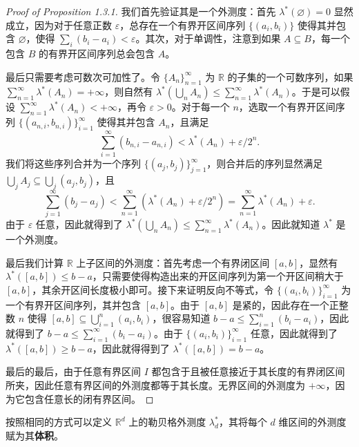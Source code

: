 \documentclass[11pt]{article}
\newcommand{\RR}{\mathbb{R}}
\newcommand{\diam}{\varnothing}
\begin{document}
\begin{proof}[Proof of Proposition 1.3.1]
    我们首先验证其是一个外测度：首先 $\lambda^*(\diam)=0$ 显然成立，因为对于任意正数 $\varepsilon$，总存在一个有界开区间序列 $\{(a_i,b_i)\}$ 使得其并包含 $\diam$，使得 $\sum_i (b_i-a_i)<\varepsilon$。其次，对于单调性，注意到如果 $A \subseteq B$，每一个包含 $B$ 的有界开区间序列总会包含 $A$。

    最后只需要考虑可数次可加性了。令 $\{A_n\}_{n=1}^{\infty}$ 为 $\RR$ 的子集的一个可数序列，如果 $\sum_{n=1}^{\infty}\lambda^*(A_n)=+\infty$，则自然有 $\lambda^*(\bigcup_n A_n)\le \sum_{n=1}^{\infty}\lambda^*(A_n)$。于是可以假设 $\sum_{n=1}^{\infty}\lambda^*(A_n)<+\infty$，再令 $\varepsilon>0$。对于每一个 $n$，选取一个有界开区间序列 $\{(a_{n,i},b_{n,i})\}_{i=1}^{\infty}$ 使得其并包含 $A_n$，且满足
    \[
        \sum_{i=1}^{\infty}(b_{n,i}-a_{n,i}) < \lambda^*(A_n) + \varepsilon / 2^n.
    \]
    我们将这些序列合并为一个序列 $\{(a_j,b_j)\}_{j=1}^{\infty}$，则合并后的序列显然满足 $\bigcup_j A_j \subseteq \bigcup_j (a_j,b_j)$，且
    \[
        \sum_{j=1}^{\infty}(b_j-a_j)
        < \sum_{n=1}^{\infty}\left(\lambda^*(A_n)+\varepsilon/2^n\right)
        = \sum_{n=1}^{\infty}\lambda^*(A_n)+\varepsilon.
    \]
    由于 $\varepsilon$ 任意，因此就得到了 $\lambda^*(\bigcup_n A_n)\le \sum_{n=1}^{\infty}\lambda^*(A_n)$。因此就知道 $\lambda^*$ 是一个外测度。

    最后我们计算 $\RR$ 上子区间的外测度：首先考虑一个有界闭区间 $[a,b]$，显然有 $\lambda^*([a,b]) \le b-a$，只需要使得构造出来的开区间序列为第一个开区间稍大于 $[a,b]$，其余开区间长度极小即可。接下来证明反向不等式，令 $\{(a_i,b_i)\}_{i=1}^{\infty}$ 为一个有界开区间序列，其并包含 $[a,b]$。由于 $[a,b]$ 是紧的，因此存在一个正整数 $n$ 使得 $[a,b] \subseteq \bigcup_{i=1}^n (a_i,b_i)$，很容易知道 $b-a \le \sum_{i=1}^n (b_i-a_i)$，因此就得到了 $b-a \le \sum_{i=1}^{\infty}(b_i-a_i)$。由于 $\{(a_i,b_i)\}_{i=1}^{\infty}$ 任意，因此就得到了 $\lambda^*([a,b]) \ge b-a$，因此就得得到了 $\lambda^*([a,b])=b-a$。

    最后的最后，由于任意有界区间 $I$ 都包含于且被任意接近于其长度的有界闭区间所夹，因此任意有界区间的外测度都等于其长度。无界区间的外测度为 $+\infty$，因为它包含任意长的闭有界区间。
\end{proof}

按照相同的方式可以定义 $\RR^d$ 上的勒贝格外测度 $\lambda_d^*$，其将每个 $d$ 维区间的外测度赋为其{\normalfont\bfseries 体积}。
\end{document}
